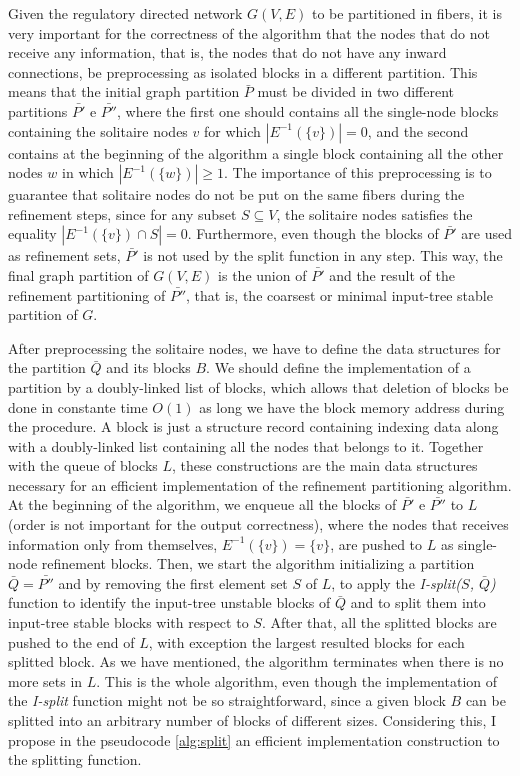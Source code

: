 \documentclass[12pt]{diazessay} %
\begin{document}
Given the regulatory directed network $G(V, E)$ to be partitioned in fibers, it is very important for the correctness of the algorithm that the nodes that do not receive any information, that is, the nodes that do not have any inward connections, be preprocessing as isolated blocks in a different partition. This means that the initial graph partition $\bar{P}$ must be divided in two different partitions $\bar{P'}$ e $\bar{P''}$, where the first one should contains all the single-node blocks containing the solitaire nodes $v$ for which $| E^{-1}(\{v\}) | = 0$, and the second contains at the beginning of the algorithm a single block containing all the other nodes $w$ in which $| E^{-1}(\{w\}) | \geq 1$. The importance of this preprocessing is to guarantee that solitaire nodes do not be put on the same fibers during the refinement steps, since for any subset $S \subseteq V$, the solitaire nodes satisfies the equality $| E^{-1}(\{v\}) \cap S | = 0$. Furthermore, even though the blocks of $\bar{P'}$ are used as refinement sets, $\bar{P'}$ is not used by the split function in any step. This way, the final graph partition of $G(V, E)$ is the union of $\bar{P'}$ and the result of the refinement partitioning of $\bar{P''}$, that is, the coarsest or minimal input-tree stable partition of $G$.

After preprocessing the solitaire nodes, we have to define the data structures for the partition $\bar{Q}$ and its blocks $B$. We should define the implementation of a partition by a doubly-linked list of blocks, which allows that deletion of blocks be done in constante time $O(1)$ as long we have the block memory address during the procedure. A block is just a structure record containing indexing data along with a doubly-linked list containing all the nodes that belongs to it. Together with the queue of blocks $L$, these constructions are the main data structures necessary for an efficient implementation of the refinement partitioning algorithm. At the beginning of the algorithm, we enqueue all the blocks of $\bar{P'}$ e $\bar{P''}$ to $L$ (order is not important for the output correctness), where the nodes that receives information only from themselves, $E^{-1}(\{v\}) = \{v\}$, are pushed to $L$ as single-node refinement blocks. Then, we start the algorithm initializing a partition $\bar{Q} = \bar{P''}$ and by removing the first element set $S$ of $L$, to apply the \textit{I-split($S$, $\bar{Q}$)} function to identify the input-tree unstable blocks of $\bar{Q}$ and to split them into input-tree stable blocks with respect to $S$. After that, all the splitted blocks are pushed to the end of $L$, with exception the largest resulted blocks for each splitted block. As we have mentioned, the algorithm terminates when there is no more sets in $L$. This is the whole algorithm, even though the implementation of the \textit{I-split} function might not be so straightforward, since a given block $B$ can be splitted into an arbitrary number of blocks of different sizes. Considering this, I propose in the pseudocode \ref{alg:split} an efficient implementation construction to the splitting function.
\end{document}
